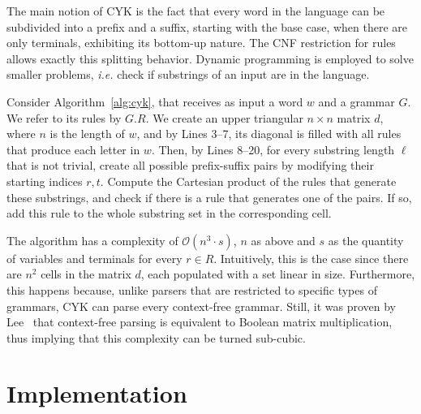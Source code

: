 \documentclass[12pt]{article}
\begin{document}
The main notion of CYK is the fact that every word in the language can be subdivided into a prefix and a suffix, starting with the base case, when there are only terminals, exhibiting its bottom-up nature. The CNF restriction for rules allows exactly this splitting behavior. Dynamic programming is employed to solve smaller problems, \emph{i.e.} check if substrings of an input are in the language.

Consider Algorithm~\ref{alg:cyk}, that receives as input a word $w$ and a grammar $G$. We refer to its rules by $G.R$. We create an upper triangular $n \times n$ matrix $d$, where $n$ is the length of $w$, and by Lines 3--7, its diagonal is filled with all rules that produce each letter in $w$. Then, by Lines 8--20, for every substring length $\ell$ that is not trivial, create all possible prefix-suffix pairs by modifying their starting indices $r, t$. Compute the Cartesian product of the rules that generate these substrings, and check if there is a rule that generates one of the pairs. If so, add this rule to the whole substring set in the corresponding cell.

The algorithm has a complexity of $\mathcal{O}(n^{3} \cdot s)$, $n$ as above and $s$ as the quantity of variables and terminals for every $r \in R$. Intuitively, this is the case since there are $n^{2}$ cells in the matrix $d$, each populated with a set linear in size. Furthermore, this happens because, unlike parsers that are restricted to specific types of grammars, CYK can parse every context-free grammar. Still, it was proven by Lee~\cite{} that context-free parsing is equivalent to Boolean matrix multiplication, thus implying that this complexity can be turned sub-cubic.

\section{Implementation}\label{sec:imp}



\end{document}
